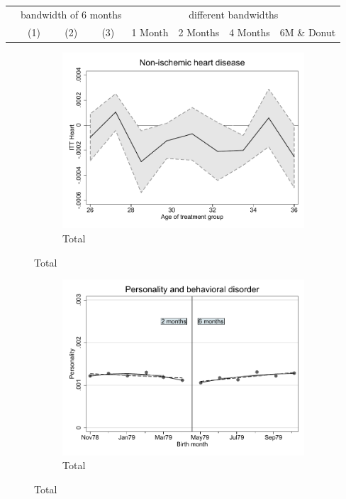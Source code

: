 \documentclass[a4paper ]{article}
\begin{document}
\begin{table}[h]\centering
\def\sym#1{\ifmmode^{#1}\else\(^{#1}\)\fi}
\begin{tabular}{l*{3}{c}|cccc}
\toprule
&\multicolumn{3}{c}{bandwidth of 6 months} & \multicolumn{4}{c}{different bandwidths} \\
 \cmidrule(lr{1em}){2-4} \cmidrule(lr{1em}){5-8}
 &\multicolumn{1}{c}{(1)}&\multicolumn{1}{c}{(2)}&\multicolumn{1}{c}{(3)}& 1 Month & 2 Months & 4 Months & 6M \& Donut \\
\midrule 

\bottomrule
\end{tabular}
\end{table}


\begin{figure}[h!]
	\centering
	\begin{subfigure}[t]{0.5\textwidth}
		\centering
		\includegraphics[width=0.99\textwidth]{R1_LC_Heart}
		\caption{Total}		
	\end{subfigure}
\end{figure}
\newpage
\begin{figure}[h]
	\centering
	\begin{subfigure}[t]{0.5\textwidth}
		\centering
		\includegraphics[width=0.99\textwidth]{R1_RD_Personality_fits}
		\caption{Total}		
	\end{subfigure}
\end{figure}
\end{document}
